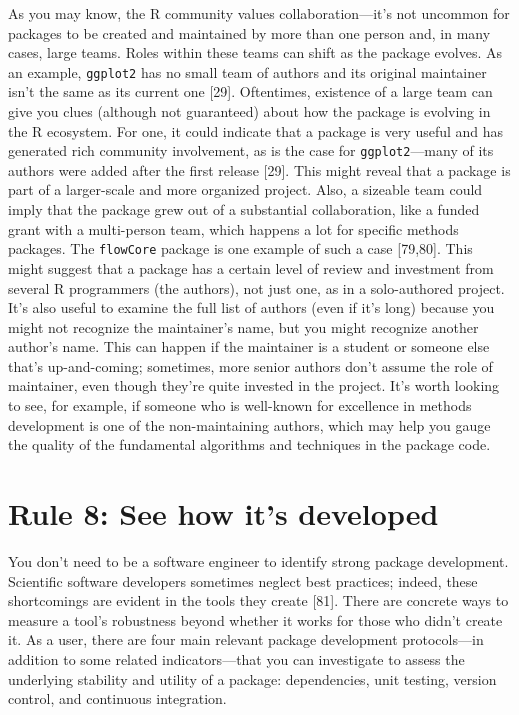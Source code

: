\documentclass[10pt,letterpaper]{article}
\begin{document}
As you may know, the R community values collaboration---it's not
uncommon for packages to be created and maintained by more than one
person and, in many cases, large teams. Roles within these teams can
shift as the package evolves. As an example, \texttt{ggplot2} has no
small team of authors and its original maintainer isn't the same as its
current one {[}29{]}. Oftentimes, existence of a large team can give you
clues (although not guaranteed) about how the package is evolving in the
R ecosystem. For one, it could indicate that a package is very useful
and has generated rich community involvement, as is the case for
\texttt{ggplot2}---many of its authors were added after the first
release {[}29{]}. This might reveal that a package is part of a
larger-scale and more organized project. Also, a sizeable team could
imply that the package grew out of a substantial collaboration, like a
funded grant with a multi-person team, which happens a lot for specific
methods packages. The \texttt{flowCore} package is one example of such a
case {[}79,80{]}. This might suggest that a package has a certain level
of review and investment from several R programmers (the authors), not
just one, as in a solo-authored project. It's also useful to examine the
full list of authors (even if it's long) because you might not recognize
the maintainer's name, but you might recognize another author's name.
This can happen if the maintainer is a student or someone else that's
up-and-coming; sometimes, more senior authors don't assume the role of
maintainer, even though they're quite invested in the project. It's
worth looking to see, for example, if someone who is well-known for
excellence in methods development is one of the non-maintaining authors,
which may help you gauge the quality of the fundamental algorithms and
techniques in the package code.

\hypertarget{rule-8-see-how-its-developed}{%
\section{Rule 8: See how it's
developed}\label{rule-8-see-how-its-developed}}

You don't need to be a software engineer to identify strong package
development. Scientific software developers sometimes neglect best
practices; indeed, these shortcomings are evident in the tools they
create {[}81{]}. There are concrete ways to measure a tool's robustness
beyond whether it works for those who didn't create it. As a user, there
are four main relevant package development protocols---in addition to
some related indicators---that you can investigate to assess the
underlying stability and utility of a package: dependencies, unit
testing, version control, and continuous integration.
\end{document}
